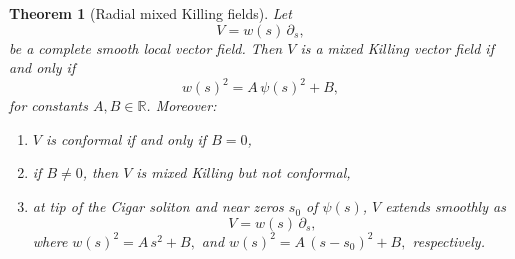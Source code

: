 \documentclass{article}
\newtheorem{theorem}{Theorem}[section]
\theoremstyle{definition}
\theoremstyle{remark}
\begin{document}
\begin{theorem}[Radial mixed Killing fields]\label{thm:radial-Cigar}
Let
\[
V = w(s)\,\partial_s,
\]
be a complete smooth local vector field. 
Then $V$ is a mixed Killing vector field 
if and only if   
\begin{equation}\label{eq:radial-classification}
w(s)^2 = A\,\psi(s)^2 + B,
\end{equation}
for constants $A,B\in\mathbb{R}$.
Moreover:
\begin{enumerate}
\item $V$ is conformal if and only if $B=0$,
\item if $B\neq 0$, then $V$ is mixed Killing but not conformal,
\item  at tip of the Cigar soliton and near zeros $s_{0}$ of  $\psi(s)$,  $V$ 
extends smoothly as  \[
V = w(s)\,\partial_s,
\] where $ w(s)^2 = A\, s^2 + B,$ and $ w(s)^2 = A\, (s - s_{0}) ^2 + B,$ 
respectively.
\end{enumerate}
\end{theorem}
\end{document}
